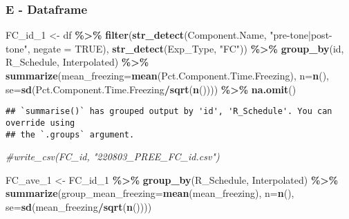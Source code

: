 \documentclass[
]{article}
\newenvironment{Shaded}{\begin{snugshade}}{\end{snugshade}}
\newcommand{\AttributeTok}[1]{\textcolor[rgb]{0.13,0.29,0.53}{#1}}
\newcommand{\CommentTok}[1]{\textcolor[rgb]{0.56,0.35,0.01}{\textit{#1}}}
\newcommand{\ConstantTok}[1]{\textcolor[rgb]{0.56,0.35,0.01}{#1}}
\newcommand{\FunctionTok}[1]{\textcolor[rgb]{0.13,0.29,0.53}{\textbf{#1}}}
\newcommand{\NormalTok}[1]{#1}
\newcommand{\OtherTok}[1]{\textcolor[rgb]{0.56,0.35,0.01}{#1}}
\newcommand{\SpecialCharTok}[1]{\textcolor[rgb]{0.81,0.36,0.00}{\textbf{#1}}}
\newcommand{\StringTok}[1]{\textcolor[rgb]{0.31,0.60,0.02}{#1}}
\begin{document}
\hypertarget{e---dataframe}{%
\subsubsection{E - Dataframe}\label{e---dataframe}}

\begin{Shaded}
\begin{Highlighting}[]
\NormalTok{FC\_id\_1 }\OtherTok{\textless{}{-}}\NormalTok{ df }\SpecialCharTok{\%\textgreater{}\%} 
  \FunctionTok{filter}\NormalTok{(}\FunctionTok{str\_detect}\NormalTok{(Component.Name, }\StringTok{"pre{-}tone|post{-}tone"}\NormalTok{, }\AttributeTok{negate =} \ConstantTok{TRUE}\NormalTok{),}
         \FunctionTok{str\_detect}\NormalTok{(Exp\_Type, }\StringTok{"FC"}\NormalTok{)) }\SpecialCharTok{\%\textgreater{}\%} 
  \FunctionTok{group\_by}\NormalTok{(id, R\_Schedule, Interpolated) }\SpecialCharTok{\%\textgreater{}\%} 
  \FunctionTok{summarize}\NormalTok{(}\AttributeTok{mean\_freezing=}\FunctionTok{mean}\NormalTok{(Pct.Component.Time.Freezing), }\AttributeTok{n=}\FunctionTok{n}\NormalTok{(),}
            \AttributeTok{se=}\FunctionTok{sd}\NormalTok{(Pct.Component.Time.Freezing}\SpecialCharTok{/}\FunctionTok{sqrt}\NormalTok{(}\FunctionTok{n}\NormalTok{()))) }\SpecialCharTok{\%\textgreater{}\%} 
  \FunctionTok{na.omit}\NormalTok{()}
\end{Highlighting}
\end{Shaded}

\begin{verbatim}
## `summarise()` has grouped output by 'id', 'R_Schedule'. You can override using
## the `.groups` argument.
\end{verbatim}

\begin{Shaded}
\begin{Highlighting}[]
\CommentTok{\#write\_csv(FC\_id, "220803\_PREE\_FC\_id.csv")}

\NormalTok{FC\_ave\_1 }\OtherTok{\textless{}{-}}\NormalTok{ FC\_id\_1 }\SpecialCharTok{\%\textgreater{}\%} 
  \FunctionTok{group\_by}\NormalTok{(R\_Schedule, Interpolated) }\SpecialCharTok{\%\textgreater{}\%} 
  \FunctionTok{summarize}\NormalTok{(}\AttributeTok{group\_mean\_freezing=}\FunctionTok{mean}\NormalTok{(mean\_freezing), }\AttributeTok{n=}\FunctionTok{n}\NormalTok{(),}
            \AttributeTok{se=}\FunctionTok{sd}\NormalTok{(mean\_freezing}\SpecialCharTok{/}\FunctionTok{sqrt}\NormalTok{(}\FunctionTok{n}\NormalTok{())))}
\end{Highlighting}
\end{Shaded}
\end{document}
